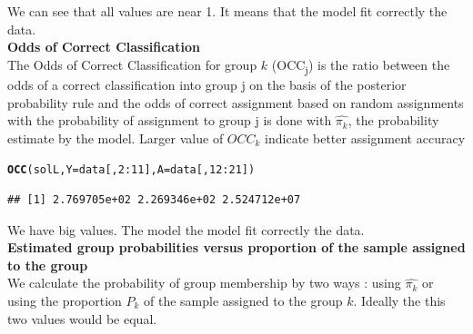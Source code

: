 \documentclass{article}\usepackage[]{graphicx}\usepackage[]{color}
\makeatletter
\newcommand{\hlnum}[1]{\textcolor[rgb]{0.686,0.059,0.569}{#1}}%
\newcommand{\hlopt}[1]{\textcolor[rgb]{0,0,0}{#1}}%
\newcommand{\hlstd}[1]{\textcolor[rgb]{0.345,0.345,0.345}{#1}}%
\newcommand{\hlkwc}[1]{\textcolor[rgb]{0.333,0.667,0.333}{#1}}%
\newcommand{\hlkwd}[1]{\textcolor[rgb]{0.737,0.353,0.396}{\textbf{#1}}}%
\newenvironment{kframe}{%
 \def\at@end@of@kframe{}%
 \ifinner\ifhmode%
  \def\at@end@of@kframe{\end{minipage}}%
  \begin{minipage}{\columnwidth}%
 \fi\fi%
 \def\FrameCommand##1{\hskip\@totalleftmargin \hskip-\fboxsep
 \colorbox{shadecolor}{##1}\hskip-\fboxsep
     \hskip-\linewidth \hskip-\@totalleftmargin \hskip\columnwidth}%
 \MakeFramed {\advance\hsize-\width
   \@totalleftmargin\z@ \linewidth\hsize
   \@setminipage}}%
 {\par\unskip\endMakeFramed%
 \at@end@of@kframe}
\newenvironment{knitrout}{}{} %
\makeatother
\begin{document}
We can see that all values are near 1. It means that the model fit correctly the data.\\

\textbf{Odds of Correct Classification}\\

The Odds of Correct Classification for group $k$ (OCC\textsubscript{j}) is the ratio between the odds of a correct classification into group j on the basis of the posterior probability rule and the odds of correct assignment based on random assignments with the probability of assignment to group j is done with $\hat{\pi_k}$, the probability estimate by the model. Larger value of $OCC_k$ indicate better assignment accuracy

\begin{knitrout}
\color{fgcolor}\begin{kframe}
\begin{alltt}
\hlkwd{OCC}\hlstd{(solL,} \hlkwc{Y} \hlstd{= data[,}\hlnum{2}\hlopt{:}\hlnum{11}\hlstd{],} \hlkwc{A} \hlstd{= data[,}\hlnum{12}\hlopt{:}\hlnum{21}\hlstd{])}
\end{alltt}
\begin{verbatim}
## [1] 2.769705e+02 2.269346e+02 2.524712e+07
\end{verbatim}
\end{kframe}
\end{knitrout}
We have big values. The model the model fit correctly the data.\\


\textbf{Estimated group probabilities versus proportion of the sample assigned to the group }\\

We calculate the probability of group membership by two ways : using $\hat{\pi_k}$ or using the proportion $P_k$ of the sample assigned to the group $k$. Ideally the this two values would be equal.
\end{document}
